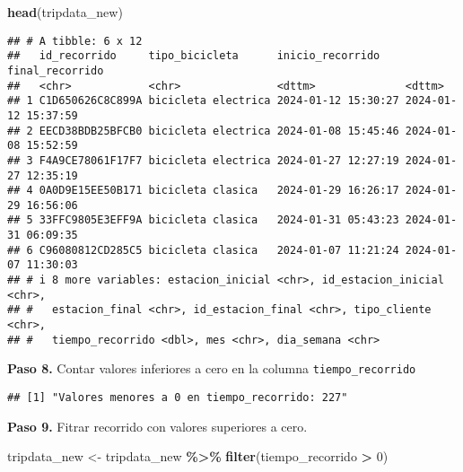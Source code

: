 \documentclass[
]{article}
\newenvironment{Shaded}{\begin{snugshade}}{\end{snugshade}}
\newcommand{\AttributeTok}[1]{\textcolor[rgb]{0.13,0.29,0.53}{#1}}
\newcommand{\ConstantTok}[1]{\textcolor[rgb]{0.56,0.35,0.01}{#1}}
\newcommand{\DecValTok}[1]{\textcolor[rgb]{0.00,0.00,0.81}{#1}}
\newcommand{\FunctionTok}[1]{\textcolor[rgb]{0.13,0.29,0.53}{\textbf{#1}}}
\newcommand{\NormalTok}[1]{#1}
\newcommand{\OtherTok}[1]{\textcolor[rgb]{0.56,0.35,0.01}{#1}}
\newcommand{\SpecialCharTok}[1]{\textcolor[rgb]{0.81,0.36,0.00}{\textbf{#1}}}
\newcommand{\StringTok}[1]{\textcolor[rgb]{0.31,0.60,0.02}{#1}}
\begin{document}
\begin{Shaded}
\begin{Highlighting}[]
\FunctionTok{head}\NormalTok{(tripdata\_new)}
\end{Highlighting}
\end{Shaded}

\begin{verbatim}
## # A tibble: 6 x 12
##   id_recorrido     tipo_bicicleta      inicio_recorrido    final_recorrido    
##   <chr>            <chr>               <dttm>              <dttm>             
## 1 C1D650626C8C899A bicicleta electrica 2024-01-12 15:30:27 2024-01-12 15:37:59
## 2 EECD38BDB25BFCB0 bicicleta electrica 2024-01-08 15:45:46 2024-01-08 15:52:59
## 3 F4A9CE78061F17F7 bicicleta electrica 2024-01-27 12:27:19 2024-01-27 12:35:19
## 4 0A0D9E15EE50B171 bicicleta clasica   2024-01-29 16:26:17 2024-01-29 16:56:06
## 5 33FFC9805E3EFF9A bicicleta clasica   2024-01-31 05:43:23 2024-01-31 06:09:35
## 6 C96080812CD285C5 bicicleta clasica   2024-01-07 11:21:24 2024-01-07 11:30:03
## # i 8 more variables: estacion_inicial <chr>, id_estacion_inicial <chr>,
## #   estacion_final <chr>, id_estacion_final <chr>, tipo_cliente <chr>,
## #   tiempo_recorrido <dbl>, mes <chr>, dia_semana <chr>
\end{verbatim}

\hfill\break
\textbf{Paso 8.} Contar valores inferiores a cero en la columna
\texttt{tiempo\_recorrido}

\begin{Shaded}
\end{Shaded}

\begin{verbatim}
## [1] "Valores menores a 0 en tiempo_recorrido: 227"
\end{verbatim}

\hfill\break
\textbf{Paso 9.} Fitrar recorrido con valores superiores a cero.

\begin{Shaded}
\begin{Highlighting}[]
\NormalTok{tripdata\_new }\OtherTok{\textless{}{-}}\NormalTok{ tripdata\_new }\SpecialCharTok{\%\textgreater{}\%} 
  \FunctionTok{filter}\NormalTok{(tiempo\_recorrido }\SpecialCharTok{\textgreater{}} \DecValTok{0}\NormalTok{)}
\end{Highlighting}
\end{Shaded}
\end{document}

